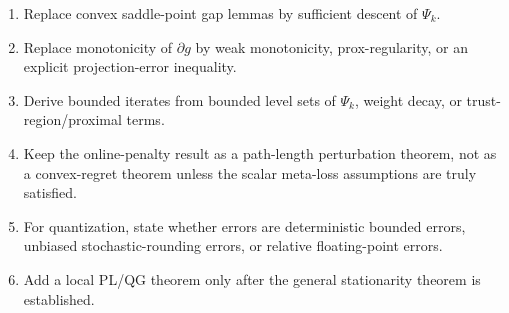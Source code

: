 \documentclass[11pt]{article}
\begin{document}
\begin{enumerate}
    \item Replace convex saddle-point gap lemmas by sufficient descent of
          \(\Psi_k\).
    \item Replace monotonicity of \(\partial g\) by weak monotonicity,
          prox-regularity, or an explicit projection-error inequality.
    \item Derive bounded iterates from bounded level sets of \(\Psi_k\), weight
          decay, or trust-region/proximal terms.
    \item Keep the online-penalty result as a path-length perturbation theorem,
          not as a convex-regret theorem unless the scalar meta-loss assumptions
          are truly satisfied.
    \item For quantization, state whether errors are deterministic bounded
          errors, unbiased stochastic-rounding errors, or relative
          floating-point errors.
    \item Add a local PL/QG theorem only after the general stationarity theorem
          is established.
\end{enumerate}
\end{document}
